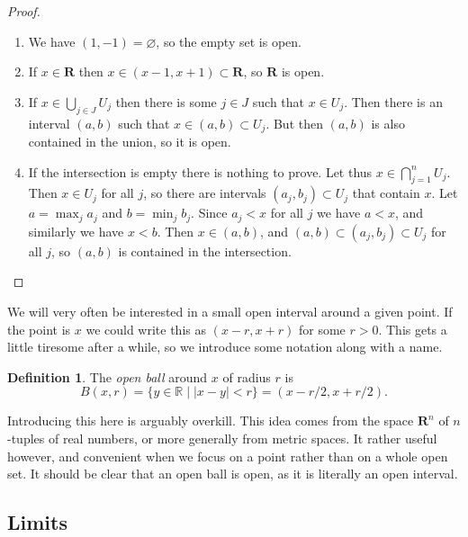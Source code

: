 \documentclass[11pt]{article}
\theoremstyle{definition}
\newtheorem{defi}[theo]{Definition}
\newcommand{\kk}[1]{\mathbb{#1}}
\def\empty{\varnothing}
\def\oint#1#2{(#1, #2)}
\def\RR{\mathbf{R}}
\begin{document}
\begin{proof}
\begin{enumerate}
\item
We have $(1,-1) = \empty$, so the empty set is open.

\item
If $x \in \RR$ then $x \in (x-1,x+1) \subset \RR$, so $\RR$ is open.

\item
If $x \in \bigcup_{j \in J} U_j$ then there is some $j \in J$ such that
$x \in U_j$.
Then there is an interval $\oint ab$ such that $x \in \oint ab \subset U_j$.
But then $\oint ab$ is also contained in the union, so it is open.

\item
If the intersection is empty there is nothing to prove.
Let thus $x \in \bigcap_{j=1}^n U_j$.
Then $x \in U_j$ for all $j$, so there are intervals $\oint{a_j}{b_j} \subset U_j$
that contain $x$.
Let $a = \max_j a_j$ and $b = \min_j b_j$.
Since $a_j < x$ for all $j$ we have $a < x$, and similarly we have $x < b$.
Then $x \in \oint ab$, and $\oint ab \subset \oint{a_j}{b_j} \subset U_j$ for all $j$,
so $\oint ab$ is contained in the intersection.
\end{enumerate}
\end{proof}



We will very often be interested in a small open interval around a given point.
If the point is $x$ we could write this as $\oint{x-r}{x+r}$ for some $r > 0$.
This gets a little tiresome after a while, so we introduce some notation along
with a name.


\begin{defi}
The \emph{open ball} around $x$ of radius $r$ is
\[
B(x, r)
= \{ y \in \kk R \mid |x - y| < r \}
= \oint{x-r/2}{x+r/2}.
\]
\end{defi}

Introducing this here is arguably overkill. This idea comes from the space
$\RR^n$ of $n$-tuples of real numbers, or more generally from metric spaces. It
rather useful however, and convenient when we focus on a point rather than on a
whole open set. It should be clear that an open ball is open, as it is
literally an open interval.



\subsection{Limits}
\end{document}
